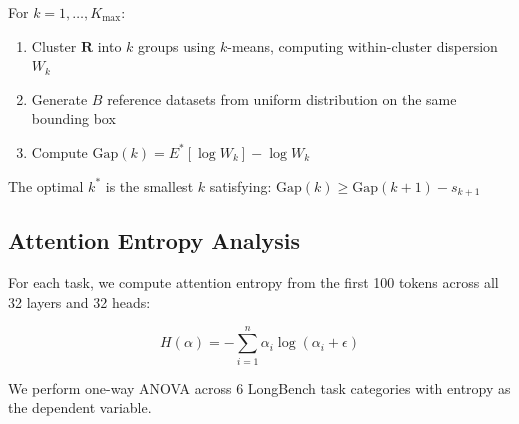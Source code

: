 For $k = 1, \ldots, K_{\max}$:
\begin{enumerate}
    \item Cluster $\mathbf{R}$ into $k$ groups using $k$-means, computing within-cluster dispersion $W_k$
    \item Generate $B$ reference datasets from uniform distribution on the same bounding box
    \item Compute $\text{Gap}(k) = E^*[\log W_k] - \log W_k$
\end{enumerate}

The optimal $k^*$ is the smallest $k$ satisfying: $\text{Gap}(k) \geq \text{Gap}(k+1) - s_{k+1}$

\subsection{Attention Entropy Analysis}

For each task, we compute attention entropy from the first 100 tokens across all 32 layers and 32 heads:

\begin{equation}
H(\alpha) = -\sum_{i=1}^{n} \alpha_i \log(\alpha_i + \epsilon)
\end{equation}

We perform one-way ANOVA across 6 LongBench task categories with entropy as the dependent variable.
